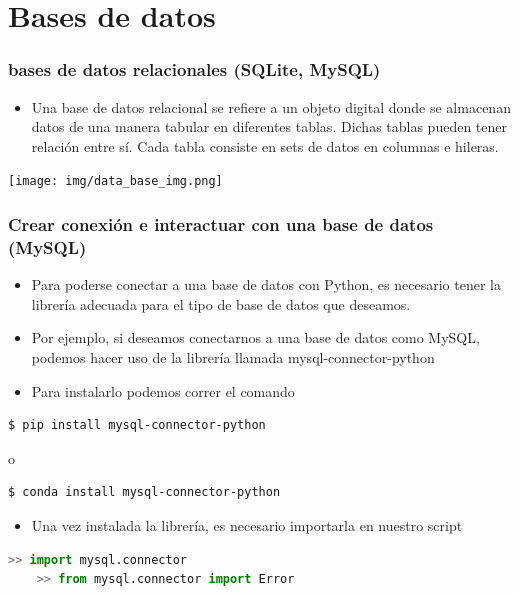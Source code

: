 \documentclass[hyperref={pdfpagelabels=false},xcolor=pst,pdf,fragile]{beamer}
\begin{document}
\section{Bases de datos}
\begin{frame}
    \frametitle{bases de datos relacionales (SQLite, MySQL)}
    \pause
    \begin{itemize}
    \item Una base de datos relacional se refiere a un objeto digital donde se almacenan datos de una manera tabular en diferentes tablas. Dichas tablas pueden tener relación entre sí. Cada tabla consiste en sets de datos en columnas e hileras. 
    \end{itemize}
\end{frame}

\begin{frame}
  \begin{center}
	  \texttt{[image: img/data\_base\_img.png]}
  \end{center}
\end{frame}

\begin{frame} [fragile]
    \frametitle{Crear conexión e interactuar con una base de datos (MySQL)}
    \begin{itemize}
    \item Para poderse conectar a una base de datos con Python, es necesario tener la librería adecuada para el tipo de base de datos que deseamos.
    \item Por ejemplo, si deseamos conectarnos a una base de datos como MySQL, podemos hacer uso de la librería llamada mysql-connector-python
    \item Para instalarlo podemos correr el comando
    \end{itemize}
    \begin{lstlisting}[language=bash]
    $ pip install mysql-connector-python
    \end{lstlisting}
    o
    \begin{lstlisting}[language=bash]
    $ conda install mysql-connector-python
    \end{lstlisting}
\end{frame}

\begin{frame} [fragile]
    \begin{itemize}
    \item Una vez instalada la librería, es necesario importarla en nuestro script
    \end{itemize}
    \begin{lstlisting}[language=python]
    >> import mysql.connector
    >> from mysql.connector import Error
    \end{lstlisting}
\end{frame}
\end{document}
